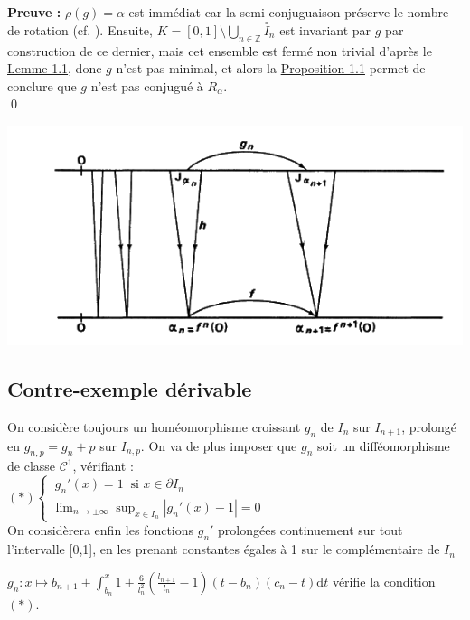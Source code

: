 \documentclass[11pt,a4paper]{article}
\begin{document}
\textbf{Preuve :} $\rho(g)=\alpha$ est immédiat car la semi-conjuguaison préserve le nombre de rotation (cf. \cite{dgv}).
Ensuite, $K = [0,1] \setminus \bigcup_{n \in \mathbb{Z}} \overset{\circ}I_{n}$ est invariant par $g$ par construction de ce dernier, mais cet ensemble est fermé non trivial d'après le  \hyperref[lem:cantor]{Lemme 1.1}, donc $g$ n'est pas minimal, et alors la \hyperref[prop:mini]{Proposition 1.1} permet de conclure que $g$ n'est pas conjugué à $R_\alpha$. \\ \qed


\begin{centering}
\includegraphics[scale=0.452]{diagram.png}
\end{centering}

\subsection{Contre-exemple dérivable}

On considère toujours un homéomorphisme croissant $g_n$ de $I_n$ sur $I_{n+1}$, prolongé en $g_{n,p} = g_n +p$ sur $I_{n,p}$. On va de plus imposer que $g_n$ soit un difféomorphisme de classe $\mathcal{C}^1$, vérifiant : \\

$(*) \begin{cases}\ g_n'(x)=1 \ \text{ si } x \in \partial I_n \\ \displaystyle \lim_{n \to \pm \infty}\sup_{x\in I_n}|g_n'(x)-1|=0 \end{cases}$ \\

On considèrera enfin les fonctions $g_n'$ prolongées continuement sur tout l'intervalle [0,1], en les prenant constantes égales à 1 sur le complémentaire de $I_n$

\begin{lemma}$\displaystyle g_n : x \mapsto b_{n+1} + \int_{b_n}^x 1 + \frac{6}{l_n^2}(\frac{l_{n+1}}{l_n} -1)(t-b_n)(c_n-t)\mathrm{d}t$ vérifie la condition $(*)$.
\end{lemma}
\end{document}
